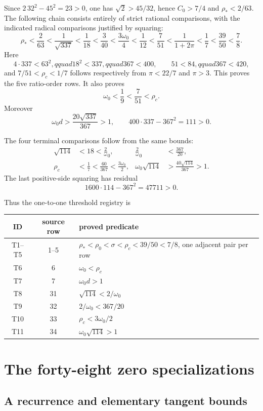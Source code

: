 \documentclass[11pt]{article}
\newcommand{\om}{\omega _0}
\newcommand{\rc}{\rho _c}
\newcommand{\rs}{\rho _*}
\begin{document}
Since \(2\,32^2-45^2=23>0\), one has
\(\sqrt2>45/32\), hence \(C_0>7/4\) and
\(\rs<2/63\).  The following chain consists entirely of strict rational
comparisons, with the indicated radical comparisons justified by squaring:
\[
 \rs<\frac2{63}<\frac1{\sqrt{337}}<\frac1{18}
 <\frac3{40}<\frac{3\om}{4}<\frac1{12}<\frac7{51}
 <\frac1{1+2\pi}<\frac17<\frac{39}{50}<\frac78.
\]
Here
\[
 4\cdot337<63^2,qquad 18^2<337,qquad 367<400,
 \qquad 51<84,qquad 367<420,
\]
and \(7/51<\rc<1/7\) follows respectively from
\(\pi<22/7\) and \(\pi>3\).  This proves the five ratio-order rows.
It also proves
\[
 \om<\frac19<\frac7{51}<\rc.
\]
Moreover
\[
 \om d>\frac{20\sqrt{337}}{367}>1,
 \qquad 400\cdot337-367^2=111>0.
\]

The four terminal comparisons follow from the same bounds:
\begin{align*}
 \sqrt{114}&<18<\frac2\om,\qquad
 &\frac2\om&<\frac{367}{20},\\
 \rc&<\frac17<\frac{60}{367}<\frac{3\om}{2},
 &\om\sqrt{114}&>\frac{40\sqrt{114}}{367}>1.
\end{align*}
The last positive-side squaring has residual
\[
 1600\cdot114-367^2=47711>0.
\]

Thus the one-to-one threshold registry is
\begin{center}
\small
\begin{tabular}{ccl}
\toprule
ID&source row&proved predicate\\
\midrule
T1--T5&1--5&\(\rs<\rho _0<\sigma<\rc<39/50<7/8\), one adjacent pair per row\\
T6&6&\(\om<\rc\)\\
T7&7&\(\om d>1\)\\
T8&31&\(\sqrt{114}<2/\om\)\\
T9&32&\(2/\om<367/20\)\\
T10&33&\(\rc<3\om/2\)\\
T11&34&\(\om\sqrt{114}>1\)\\
\bottomrule
\end{tabular}
\end{center}

\section{The forty-eight zero specializations}

\subsection{A recurrence and elementary tangent bounds}
\end{document}
